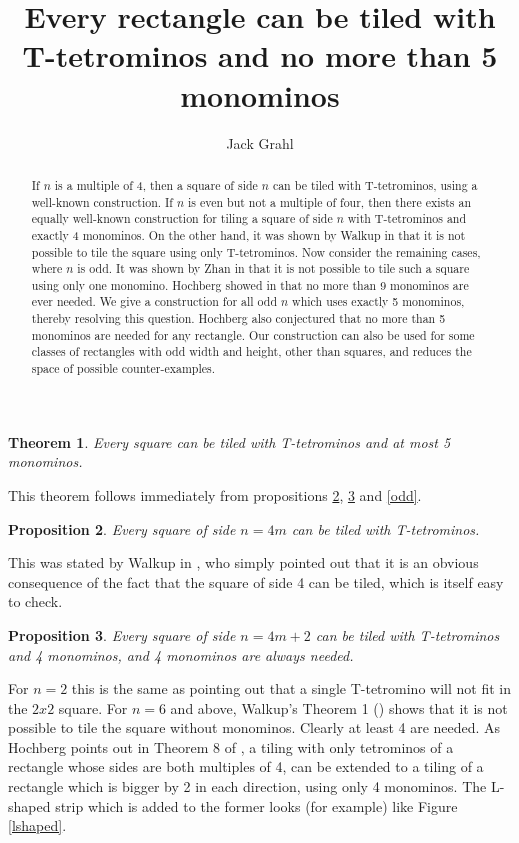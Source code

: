 \documentclass{article}
\title{Every rectangle can be tiled with T-tetrominos and no more than 5 monominos}
\author{Jack Grahl}
\theoremstyle{plain}
\newtheorem{theorem}{Theorem}[section]
\newtheorem{proposition}[theorem]{Proposition}
\begin{document}
\maketitle

\begin{abstract}
If $n$ is a multiple of 4, then a square of side $n$ can be tiled with T-tetrominos, using a well-known construction.
If $n$ is even but not a multiple of four, then there exists an equally well-known construction for tiling a square of side $n$ with T-tetrominos and exactly 4 monominos.
On the other hand, it was shown by Walkup in \cite{walkup} that it is not possible to tile the square using only T-tetrominos.
Now consider the remaining cases, where $n$ is odd.
It was shown by Zhan in \cite{zhan} that it is not possible to tile such a square using only one monomino.
Hochberg showed in \cite{hochberg} that no more than 9 monominos are ever needed.
We give a construction for all odd $n$ which uses exactly 5 monominos, thereby resolving this question.
Hochberg also conjectured that no more than 5 monominos are needed for any rectangle.
Our construction can also be used for some classes of rectangles with odd width and height, other than squares, and reduces the space of possible counter-examples.
\end{abstract}

\begin{theorem}
Every square can be tiled with T-tetrominos and at most 5 monominos.
\end{theorem}
This theorem follows immediately from propositions \ref{four}, \ref{even} and \ref{odd}.

\begin{proposition}\label{four}
Every square of side $n = 4m$ can be tiled with T-tetrominos.
\end{proposition}
This was stated by Walkup in \cite{walkup}, who simply pointed out that it is an obvious consequence of the fact that the square of side 4 can be tiled, which is itself easy to check.

\begin{proposition}\label{even}
Every square of side $n = 4m + 2$ can be tiled with T-tetrominos and 4 monominos, and 4 monominos are always needed.
\end{proposition}
For $n = 2$ this is the same as pointing out that a single T-tetromino will not fit in the $2x2$ square.
For $n=6$ and above, Walkup's Theorem 1 (\cite{walkup}) shows that it is not possible to tile the square without monominos.
Clearly at least 4 are needed.
As Hochberg points out in Theorem 8 of \cite{hochberg}, a tiling with only tetrominos of a rectangle whose sides are both multiples of 4, can be extended to a tiling of a rectangle which is bigger by 2 in each direction, using only 4 monominos.
The L-shaped strip which is added to the former looks (for example) like Figure \ref{lshaped}.
\end{document}
